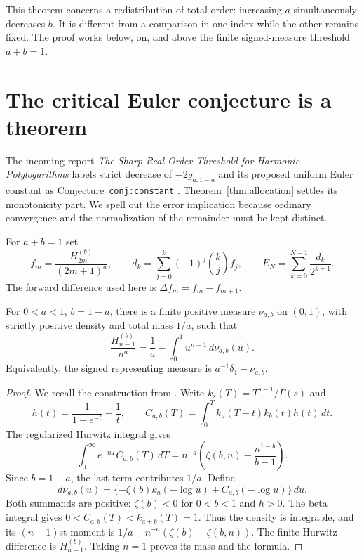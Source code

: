 This theorem concerns a redistribution of total order: increasing $a$
simultaneously decreases $b$. It is different from a comparison in one
index while the other remains fixed. The proof works below, on, and
above the finite signed-measure threshold $a+b=1$.

\section{The critical Euler conjecture is a theorem}
\label{sec:critical}

The incoming report \emph{The Sharp Real-Order Threshold for Harmonic
Polylogarithms} labels strict decrease of $-2g_{a,1-a}$ and its proposed
uniform Euler constant as Conjecture~\texttt{conj:constant}
\cite{realorder}. Theorem~\ref{thm:allocation} settles its monotonicity
part. We spell out the error implication because ordinary convergence
and the normalization of the remainder must be kept distinct.

For $a+b=1$ set
\begin{equation}\label{eq:eulerdef}
 f_m=\frac{H_{2m}^{(b)}}{(2m+1)^a},\qquad
 d_k=\sum_{j=0}^k(-1)^j\binom kj f_j,
 \qquad E_N=\sum_{k=0}^{N-1}\frac{d_k}{2^{k+1}}.
\end{equation}
The forward difference used here is $\Delta f_m=f_m-f_{m+1}$.

\begin{lemma}\label{lem:criticalmeasure}
For $0<a<1$, $b=1-a$, there is a finite positive measure $\nu_{a,b}$
on $(0,1)$, with strictly positive density and total mass $1/a$, such that
\begin{equation}\label{eq:criticalmom}
 \frac{H_{n-1}^{(b)}}{n^a}
   =\frac1a-\int_0^1u^{n-1}\,d\nu_{a,b}(u).
\end{equation}
Equivalently, the signed representing measure is
$a^{-1}\delta_1-\nu_{a,b}$.
\end{lemma}
\begin{proof}
We recall the construction from \cite{realorder}. Write
$k_s(T)=T^{s-1}/\Gamma(s)$ and
\[
 h(t)=\frac1{1-e^{-t}}-\frac1t,\qquad
 C_{a,b}(T)=\int_0^T k_a(T-t)k_b(t)h(t)\,dt.
\]
The regularized Hurwitz integral \cite{dlmf-hurwitz} gives
\[
 \int_0^\infty e^{-nT}C_{a,b}(T)\,dT
 =n^{-a}\left(\zeta(b,n)-\frac{n^{1-b}}{b-1}\right).
\]
Since $b=1-a$, the last term contributes $1/a$. Define
\[
 d\nu_{a,b}(u)
 =\{-\zeta(b)k_a(-\log u)+C_{a,b}(-\log u)\}\,du.
\]
Both summands are positive: $\zeta(b)<0$ for $0<b<1$ and $h>0$.
The beta integral gives $0<C_{a,b}(T)<k_{a+b}(T)=1$.
Thus the density is integrable, and its $(n-1)$st moment is
$1/a-n^{-a}(\zeta(b)-\zeta(b,n))$. The finite Hurwitz difference is
$H_{n-1}^{(b)}$. Taking $n=1$ proves its mass and the formula.
\end{proof}


